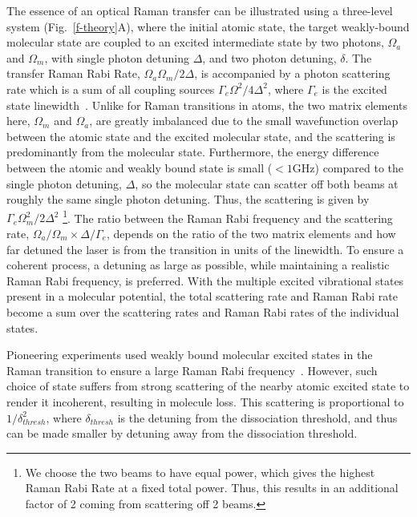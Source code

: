 \documentclass[aps,prl,twocolumn,superscriptaddress]{revtex4-1}
\begin{document}
The essence of an optical Raman transfer can be illustrated using a three-level system (Fig.~\ref{f-theory}A), where the initial atomic state, the target weakly-bound molecular state are coupled to an excited intermediate state by two photons, $\Omega_a$ and $\Omega_m$, with single photon detuning $ \Delta $, and two photon detuning, $ \delta$.  %
The transfer Raman Rabi Rate, $ \Omega_a\Omega_m / 2\Delta$, is accompanied by a photon scattering rate which is a sum of all coupling sources %
$\Gamma_e \Omega^2 / 4\Delta^2 $, where $ \Gamma_e $ is the excited state linewidth~\cite{Wineland2003}. %
Unlike for Raman transitions in atoms, the two matrix elements here, $ \Omega_m$ and $ \Omega_a$, are greatly imbalanced %
due to the small wavefunction overlap between the atomic state and the excited molecular state, and the scattering is predominantly from the molecular state. Furthermore, the energy difference between the atomic and weakly bound state is small ($ < 1 \mathrm{GHz} $) compared to the single photon detuning, $ \Delta $, so the molecular state can scatter off both beams at roughly the same single photon detuning. Thus, the scattering is given by $ \Gamma_e \Omega_m^2 / 2\Delta^2$ \footnote{We choose the two beams to have equal power, which gives the highest Raman Rabi Rate at a fixed total power. Thus, this results in an additional factor of 2 coming from scattering off 2 beams.}.
The ratio between the Raman Rabi frequency and the scattering rate, $ \Omega_a/\Omega_m \times \Delta/\Gamma_e $, depends on the ratio of the two matrix elements and how far detuned the laser is from the transition in units of the linewidth. To ensure a coherent process, a detuning as large as possible, while maintaining a realistic Raman Rabi frequency, is preferred. %
With the multiple excited vibrational states present in a molecular potential, the total scattering rate and Raman Rabi rate become a sum over the scattering rates and Raman Rabi rates of the individual states. %

Pioneering experiments used weakly bound molecular excited states in the Raman transition to ensure a large Raman Rabi frequency~\cite{Wynar2000,Rom2004}. However, such choice of state suffers from strong scattering of the nearby atomic excited state to render it incoherent, resulting in molecule loss. This scattering is  proportional to $1/\delta_{thresh}^2$, where $\delta_{thresh}$ is the detuning from the dissociation threshold, and thus can  be made smaller by detuning away from the dissociation threshold.
\end{document}
